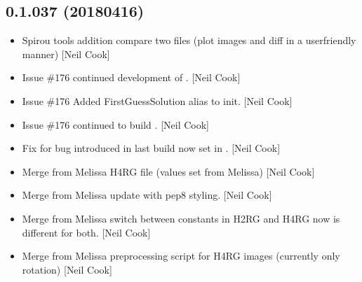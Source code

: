 \documentclass[a4paper,10pt,english]{report}
\begin{document}
\subsection{0.1.037 (2018\sphinxhyphen{}04\sphinxhyphen{}16)}
\label{\detokenize{misc/changelog:id481}}\begin{itemize}
\item {} 
Spirou tools addition \sphinxhyphen{} compare two files (plot images and diff in a
user\sphinxhyphen{}friendly manner) {[}Neil Cook{]}

\item {} 
Issue \#176 \sphinxhyphen{} continued development of . {[}Neil Cook{]}

\item {} 
Issue \#176 \sphinxhyphen{} Added FirstGuessSolution alias to init. {[}Neil Cook{]}

\item {} 
Issue \#176 \sphinxhyphen{} continued to build . {[}Neil Cook{]}

\item {} 
Fix for bug introduced in last build \sphinxhyphen{}  now set in
. {[}Neil Cook{]}

\item {} 
Merge from Melissa \sphinxhyphen{} H4RG  file (values set from
Melissa) {[}Neil Cook{]}

\item {} 
Merge from Melissa \sphinxhyphen{} update  with pep8 styling.
{[}Neil Cook{]}

\item {} 
Merge from Melissa \sphinxhyphen{} switch between constants in H2RG and H4RG now
 is different for both. {[}Neil Cook{]}

\item {} 
Merge from Melissa \sphinxhyphen{} pre\sphinxhyphen{}processing script for H4RG images (currently
only rotation) {[}Neil Cook{]}

\end{itemize}
\end{document}
